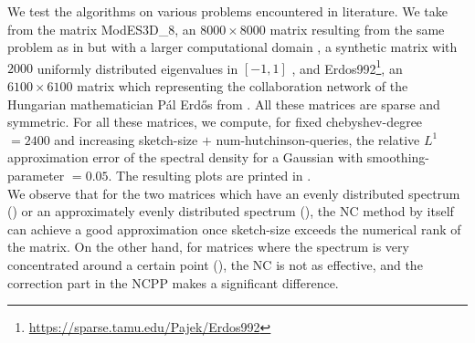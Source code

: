 We test the algorithms on various problems encountered in literature.
We take from the matrix ModES3D\_8, an $8000 \times 8000$ matrix resulting
from the same problem as in  but with
a larger computational domain \cite{lin2017randomized},
a synthetic matrix with $2000$ uniformly distributed eigenvalues in
$[-1, 1]$ \cite{chen2021slq}, and Erdos992\footnote{\url{https://sparse.tamu.edu/Pajek/Erdos992}},
an $6100 \times 6100$ matrix which representing the collaboration network of the
Hungarian mathematician P\'al Erd\H{o}s from \cite{chen2021slq}. All these
matrices are sparse and symmetric. For all these matrices, we compute, for
fixed \gls{chebyshev-degree} $=2400$ and increasing \gls{sketch-size} $+$ \gls{num-hutchinson-queries},
the relative $L^1$ approximation error
of the spectral density for a Gaussian  with
\gls{smoothing-parameter} $=0.05$. The resulting plots are printed in 
.\\ 

We observe that for the two matrices which have an evenly distributed spectrum
() or an approximately
evenly distributed spectrum (),
the \gls{NC} method by itself can achieve a good approximation once \gls{sketch-size}
exceeds the numerical rank of the matrix. On the other hand, for matrices where
the spectrum is very concentrated around a certain point (),
the \gls{NC} is not as effective, and the correction part in the \gls{NCPP} makes
a significant difference.

